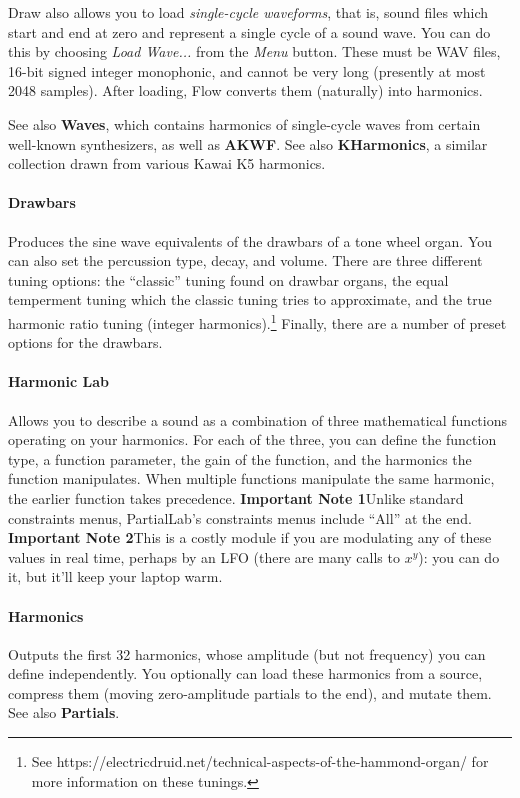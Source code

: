 \documentclass{article}
\begin{document}
Draw also allows you to load {\it single-cycle waveforms}, that is, sound files which start and end at zero and represent a single cycle of a sound wave.  You can do this by choosing {\it Load Wave...} from the {\it Menu} button.  These must be WAV files, 16-bit signed integer monophonic, and cannot be very long (presently at most 2048 samples).  After loading, Flow converts them (naturally) into harmonics.

See also {\bf Waves}, which contains harmonics of single-cycle waves from certain well-known synthesizers, as well as {\bf AKWF}.  See also {\bf KHarmonics}, a similar collection drawn from various Kawai K5 harmonics.

\paragraph{Drawbars}   Produces the sine wave equivalents of the drawbars of a tone wheel organ.  You can also set the percussion type, decay, and volume.  There are three different tuning options: the ``classic'' tuning found on drawbar organs, the equal temperment tuning which the classic tuning tries to approximate, and the true harmonic ratio tuning (integer harmonics).\footnote{See https:/\!/electricdruid.net/technical-aspects-of-the-hammond-organ/ for more information on these tunings.}  Finally, there are a number of preset options for the drawbars.

\paragraph{Harmonic Lab}  Allows you to describe a sound as a combination of three mathematical functions operating on your harmonics.  For each of the three, you can define the function type, a function parameter, the gain of the function, and the harmonics the function manipulates.  When multiple functions manipulate the same harmonic, the earlier function takes precedence.  {\bf Important Note 1}\quad Unlike standard constraints menus, PartialLab's constraints menus include ``All'' at the end.  {\bf Important Note 2}\quad This is a costly module if you are modulating any of these values in real time, perhaps by an LFO (there are many calls to \(x^y\)): you can do it, but it'll keep your laptop warm.

\paragraph{Harmonics}  Outputs the first 32 harmonics, whose amplitude (but not frequency) you can define independently.  You optionally can load these harmonics from a source, compress them (moving zero-amplitude partials to the end), and mutate them. See also {\bf Partials}.
\end{document}
